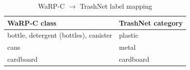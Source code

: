 \documentclass[conference]{IEEEtran}
\begin{document}
\begin{table}[htbp]
\caption{WaRP-C $\to$ TrashNet label mapping}
\label{tab:warpc-map}
\begin{center}
\footnotesize
\begin{tabular}{@{}ll@{}}
\toprule
\textbf{WaRP-C class} & \textbf{TrashNet category} \\
\midrule
bottle, detergent (bottles), canister & plastic \\
cans & metal \\
cardboard & cardboard \\
\bottomrule
\end{tabular}
\end{center}
\end{table}
\end{document}
